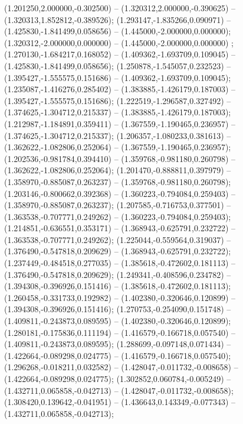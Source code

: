  (1.201250,2.000000,-0.302500) -- (1.320312,2.000000,-0.390625) -- (1.320313,1.852812,-0.389526);
 (1.293147,-1.835266,0.090971) -- (1.425830,-1.841499,0.058656) -- (1.445000,-2.000000,0.000000);
 (1.320312,-2.000000,0.000000) -- (1.445000,-2.000000,0.000000) ;
 (1.270130,-1.684217,0.168052) -- (1.409362,-1.693709,0.109045) -- (1.425830,-1.841499,0.058656);
 (1.250878,-1.545057,0.232523) -- (1.395427,-1.555575,0.151686) -- (1.409362,-1.693709,0.109045);
 (1.235087,-1.416276,0.285402) -- (1.383885,-1.426179,0.187003) -- (1.395427,-1.555575,0.151686);
 (1.222519,-1.296587,0.327492) -- (1.374625,-1.304712,0.215337) -- (1.383885,-1.426179,0.187003);
 (1.212987,-1.184891,0.359411) -- (1.367559,-1.190465,0.236957) -- (1.374625,-1.304712,0.215337);
 (1.206357,-1.080233,0.381613) -- (1.362622,-1.082806,0.252064) -- (1.367559,-1.190465,0.236957);
 (1.202536,-0.981784,0.394410) -- (1.359768,-0.981180,0.260798) -- (1.362622,-1.082806,0.252064);
 (1.201470,-0.888811,0.397979) -- (1.358970,-0.885087,0.263237) -- (1.359768,-0.981180,0.260798);
 (1.203146,-0.800662,0.392368) -- (1.360223,-0.794084,0.259403) -- (1.358970,-0.885087,0.263237);
 (1.207585,-0.716753,0.377501) -- (1.363538,-0.707771,0.249262) -- (1.360223,-0.794084,0.259403);
 (1.214851,-0.636551,0.353171) -- (1.368943,-0.625791,0.232722) -- (1.363538,-0.707771,0.249262);
 (1.225044,-0.559564,0.319037) -- (1.376490,-0.547818,0.209629) -- (1.368943,-0.625791,0.232722);
 (1.237449,-0.484518,0.277035) -- (1.385618,-0.472602,0.181113) -- (1.376490,-0.547818,0.209629);
 (1.249341,-0.408596,0.234782) -- (1.394308,-0.396926,0.151416) -- (1.385618,-0.472602,0.181113);
 (1.260458,-0.331733,0.192982) -- (1.402380,-0.320646,0.120899) -- (1.394308,-0.396926,0.151416);
 (1.270753,-0.254090,0.151748) -- (1.409811,-0.243873,0.089595) -- (1.402380,-0.320646,0.120899);
 (1.280181,-0.175836,0.111194) -- (1.416579,-0.166718,0.057540) -- (1.409811,-0.243873,0.089595);
 (1.288699,-0.097148,0.071434) -- (1.422664,-0.089298,0.024775) -- (1.416579,-0.166718,0.057540);
 (1.296268,-0.018211,0.032582) -- (1.428047,-0.011732,-0.008658) -- (1.422664,-0.089298,0.024775);
 (1.302852,0.060784,-0.005249) -- (1.432711,0.065858,-0.042713) -- (1.428047,-0.011732,-0.008658);
 (1.308420,0.139642,-0.041951) -- (1.436643,0.143349,-0.077343) -- (1.432711,0.065858,-0.042713);
